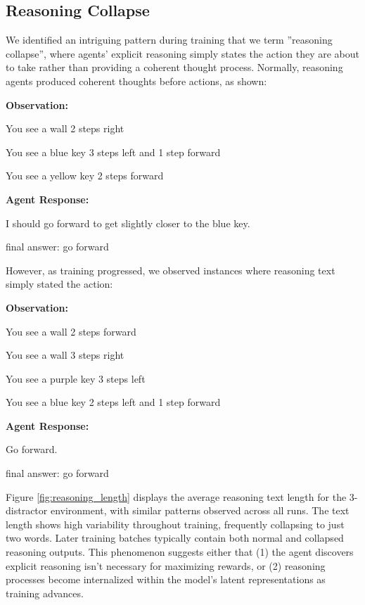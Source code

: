\documentclass[11pt,a4paper]{article}
\begin{document}
\subsection{Reasoning Collapse}
We identified an intriguing pattern during training that we term ''reasoning collapse'', 
where agents' explicit reasoning simply states the action they are about to take rather than providing a coherent thought process.
Normally, reasoning agents produced coherent thoughts before actions, as shown:
\begin{tcolorbox}[
    enhanced,
    title={Normal Reasoning Example},
    fonttitle=\bfseries,
    colback=gray!10,
    colframe=black!50,
    boxrule=0.5pt,
    arc=2pt,
    outer arc=2pt,
    top=2pt,
    bottom=2pt,
    left=4pt,
    right=4pt,
    boxsep=2pt
]
\textbf{Observation:}

You see a wall 2 steps right

You see a blue key 3 steps left and 1 step forward

You see a yellow key 2 steps forward

\textbf{Agent Response:}

I should go forward to get slightly closer to the blue key.

final answer: go forward
\end{tcolorbox}
However, as training progressed, we observed instances where reasoning text simply stated the action:
\begin{tcolorbox}[
    enhanced,
    title={Collapsed Reasoning Example},
    fonttitle=\bfseries,
    colback=gray!10,
    colframe=black!50,
    boxrule=0.5pt,
    arc=2pt,
    outer arc=2pt,
    top=2pt,
    bottom=2pt,
    left=4pt,
    right=4pt,
    boxsep=2pt
]
\textbf{Observation:}

You see a wall 2 steps forward

You see a wall 3 steps right

You see a purple key 3 steps left

You see a blue key 2 steps left and 1 step forward

\textbf{Agent Response:}

Go forward.

final answer: go forward
\end{tcolorbox}

Figure \ref{fig:reasoning_length} displays the average reasoning text length for the 3-distractor environment, 
with similar patterns observed across all runs. 
The text length shows high variability throughout training, 
frequently collapsing to just two words. 
Later training batches typically contain both normal and collapsed reasoning outputs. 
This phenomenon suggests either that (1) the agent discovers explicit reasoning isn't necessary for maximizing rewards, 
or (2) reasoning processes become internalized within the model's latent representations as training advances.
\end{document}
